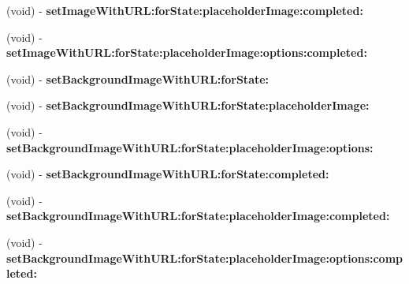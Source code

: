 \begin{DoxyCompactItemize}
\item 
\mbox{\label{category_u_i_button_07_web_cache_deprecated_08_ad32bd026acbeff8c57ef90286035bf4f}} 
(void) -\/ {\bfseries set\+Image\+With\+U\+R\+L\+:for\+State\+:placeholder\+Image\+:completed\+:}
\item 
\mbox{\label{category_u_i_button_07_web_cache_deprecated_08_a130e16009587a3cf79999c2d8676a141}} 
(void) -\/ {\bfseries set\+Image\+With\+U\+R\+L\+:for\+State\+:placeholder\+Image\+:options\+:completed\+:}
\item 
\mbox{\label{category_u_i_button_07_web_cache_deprecated_08_a2df87b69c2a70931d6ace8e101f3ab66}} 
(void) -\/ {\bfseries set\+Background\+Image\+With\+U\+R\+L\+:for\+State\+:}
\item 
\mbox{\label{category_u_i_button_07_web_cache_deprecated_08_a04e2078e143ef236994b34187094f52c}} 
(void) -\/ {\bfseries set\+Background\+Image\+With\+U\+R\+L\+:for\+State\+:placeholder\+Image\+:}
\item 
\mbox{\label{category_u_i_button_07_web_cache_deprecated_08_a1a449c312557b7ed3a360b9b6adb8134}} 
(void) -\/ {\bfseries set\+Background\+Image\+With\+U\+R\+L\+:for\+State\+:placeholder\+Image\+:options\+:}
\item 
\mbox{\label{category_u_i_button_07_web_cache_deprecated_08_aa950b8add8cd360e58193f47a790cd83}} 
(void) -\/ {\bfseries set\+Background\+Image\+With\+U\+R\+L\+:for\+State\+:completed\+:}
\item 
\mbox{\label{category_u_i_button_07_web_cache_deprecated_08_a1a48289e60d95afb306370cd7b6e02b5}} 
(void) -\/ {\bfseries set\+Background\+Image\+With\+U\+R\+L\+:for\+State\+:placeholder\+Image\+:completed\+:}
\item 
\mbox{\label{category_u_i_button_07_web_cache_deprecated_08_a9daaed34152ed47fe4bb93400e1f0eb4}} 
(void) -\/ {\bfseries set\+Background\+Image\+With\+U\+R\+L\+:for\+State\+:placeholder\+Image\+:options\+:completed\+:}

\end{DoxyCompactItemize}
